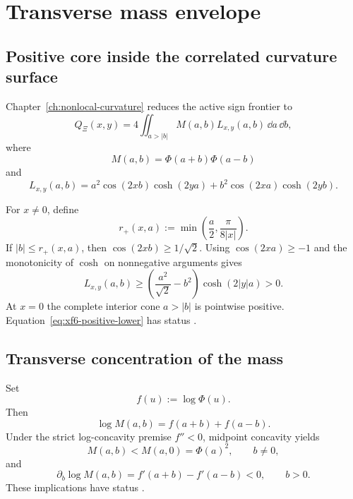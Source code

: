 \chapter{Transverse mass envelope}\label{ch:transverse-mass-envelope}

\section{Positive core inside the correlated curvature surface}

Chapter~\ref{ch:nonlocal-curvature} reduces the active sign frontier to
\begin{equation}\label{eq:xf6-q-surface}
Q_\Xi(x,y)
=
4\iint_{a>|b|}M(a,b)L_{x,y}(a,b)\,\dd a\,\dd b,
\end{equation}
where
\[
M(a,b)=\Phi(a+b)\Phi(a-b)
\]
and
\[
L_{x,y}(a,b)
=
a^2\cos(2xb)\cosh(2ya)
+b^2\cos(2xa)\cosh(2yb).
\]

For $x\neq0$, define
\begin{equation}\label{eq:xf6-positive-radius}
r_+(x,a)
:=
\min\!\left(\frac a2,\frac{\pi}{8|x|}\right).
\end{equation}
If $|b|\le r_+(x,a)$, then $\cos(2xb)\ge1/\sqrt2$.  Using $\cos(2xa)\ge-1$ and the monotonicity of $\cosh$ on nonnegative arguments gives
\begin{equation}\label{eq:xf6-positive-lower}
\boxed{
L_{x,y}(a,b)
\ge
\left(\frac{a^2}{\sqrt2}-b^2\right)
\cosh(2|y|a)>0.
}
\end{equation}
At $x=0$ the complete interior cone $a>|b|$ is pointwise positive.  Equation~\eqref{eq:xf6-positive-lower} has status .

\section{Transverse concentration of the mass}

Set
\[
f(u):=\log\Phi(u).
\]
Then
\begin{equation}\label{eq:xf6-log-mass}
\log M(a,b)=f(a+b)+f(a-b).
\end{equation}
Under the strict log-concavity premise $f''<0$, midpoint concavity yields
\begin{equation}\label{eq:xf6-center-dominance}
\boxed{
M(a,b)<M(a,0)=\Phi(a)^2,
\qquad b\neq0,
}
\end{equation}
and
\begin{equation}\label{eq:xf6-mass-slope}
\partial_b\log M(a,b)
=f'(a+b)-f'(a-b)<0,
\qquad b>0.
\end{equation}
These implications have status .

